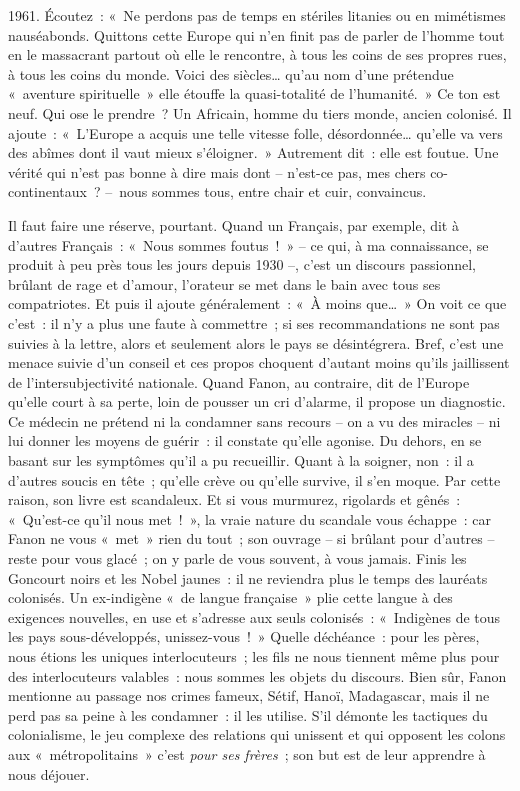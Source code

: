 \documentclass[french,twoside]{book} %
\begin{document}
1961. Écoutez : « Ne perdons pas de temps en stériles litanies ou en mimétismes nauséabonds. Quittons cette Europe qui n’en finit pas de parler de l’homme tout en le massacrant partout où elle le rencontre, à tous les coins de ses propres rues, à tous les coins du monde. Voici des siècles… qu’au nom d’une prétendue « aventure spirituelle » elle étouffe la quasi-totalité de l’humanité. » Ce ton est neuf. Qui ose le prendre ? Un Africain, homme du tiers monde, ancien colonisé. Il ajoute : « L’Europe a acquis une telle vitesse folle, désordonnée… qu’elle va vers des abîmes dont il vaut mieux s’éloigner. » Autrement dit : elle est foutue. Une vérité qui n’est pas bonne à dire mais dont – n’est-ce pas, mes chers co-continentaux ? – nous sommes tous, entre chair et cuir, convaincus.\par
 Il faut faire une réserve, pourtant. Quand un Français, par exemple, dit à d’autres Français : « Nous sommes foutus ! » – ce qui, à ma connaissance, se produit à peu près tous les jours depuis 1930 –, c’est un discours passionnel, brûlant de rage et d’amour, l’orateur se met dans le bain avec tous ses compatriotes. Et puis il ajoute généralement : « À moins que… » On voit ce que c’est : il n’y a plus une faute à commettre ; si ses recommandations ne sont pas suivies à la lettre, alors et seulement alors le pays se désintégrera. Bref, c’est une menace suivie d’un conseil et ces propos choquent d’autant moins qu’ils jaillissent de l’intersubjectivité nationale. Quand Fanon, au contraire, dit de l’Europe qu’elle court à sa perte, loin de pousser un cri d’alarme, il propose un diagnostic. Ce médecin ne prétend ni la condamner sans recours – on a vu des miracles – ni lui donner les moyens de guérir : il constate qu’elle agonise. Du dehors, en se basant sur les symptômes qu’il a pu recueillir. Quant à la soigner, non : il a d’autres soucis en tête ; qu’elle crève ou qu’elle survive, il s’en moque. Par cette raison, son livre est scandaleux. Et si vous murmurez, rigolards et gênés : « Qu’est-ce qu’il nous met ! », la vraie nature du scandale vous échappe : car Fanon ne vous « met » rien du tout ; son ouvrage – si brûlant pour d’autres – reste pour vous glacé ; on y parle de vous souvent, à vous jamais. Finis les Goncourt noirs et les Nobel jaunes : il ne reviendra plus le temps des lauréats colonisés. Un ex-indigène « de langue française » plie cette langue à des exigences nouvelles, en use et s’adresse aux seuls colonisés : « Indigènes de tous les pays sous-développés, unissez-vous ! » Quelle déchéance : pour les pères, nous étions les uniques interlocuteurs ; les fils ne nous tiennent même plus pour des interlocuteurs valables : nous sommes les objets du discours. Bien sûr, Fanon mentionne au passage nos crimes fameux, Sétif, Hanoï, Madagascar, mais il ne perd pas sa peine à les condamner : il les utilise. S’il démonte les tactiques du colonialisme, le jeu complexe des relations qui unissent et qui opposent les colons aux « métropolitains » c’est \emph{pour ses frères} ; son but est de leur apprendre à nous déjouer.\par
\end{document}
